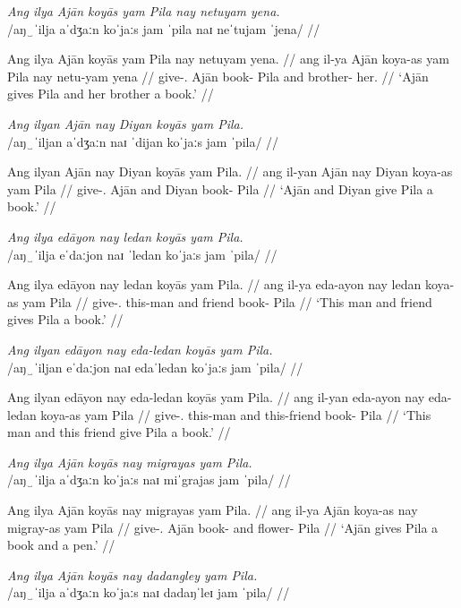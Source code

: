 \documentclass[12pt,a4paper]{scrartcl}
\newcommand{\TsgM}{{\Tsg}.{\M}}
\newcommand{\TplM}{{\Tpl}.{\M}}
\begin{document}
\ex\begingl
\glpreamble \textit{Ang ilya Ajān koyās yam Pila nay netuyam yena.}\\
	/aŋ‿ˈilja aˈdʒaːn koˈjaːs jam ˈpila naɪ neˈtujam ˈjena/ //

\gla Ang ilya Ajān koyās yam Pila nay netuyam yena. //
\glb ang il-ya Ajān koya-as yam Pila nay netu-yam yena //
\glc \AgtT{} give-\TsgM{} Ajān book-\Parg{} \Dat{} Pila and brother-\Dat{} her.\Gen{} //
\glft `Ajān gives Pila and her brother a book.' //
\endgl\xe

\ex\begingl
\glpreamble \textit{Ang ilyan Ajān nay Diyan koyās yam Pila.}\\
	/aŋ‿ˈiljan aˈdʒaːn naɪ ˈdijan koˈjaːs jam ˈpila/ //

\gla Ang ilyan Ajān nay Diyan koyās yam Pila. //
\glb ang il-yan Ajān nay Diyan koya-as yam Pila //
\glc \AgtT{} give-\TplM{} Ajān and Diyan book-\Parg{} \Dat{} Pila //
\glft `Ajān and Diyan give Pila a book.' //
\endgl\xe

\ex\begingl
\glpreamble \textit{Ang ilya edāyon nay ledan koyās yam Pila.}\\
	/aŋ‿ˈilja eˈdaːjon naɪ ˈledan koˈjaːs jam ˈpila/ //

\gla Ang ilya edāyon nay ledan koyās yam Pila. //
\glb ang il-ya eda-ayon nay ledan koya-as yam Pila //
\glc \AgtT{} give-\TsgM{} this-man and friend book-\Parg{} \Dat{} Pila //
\glft `This man and friend gives Pila a book.' //
\endgl\xe

\ex\begingl
\glpreamble \textit{Ang ilyan edāyon nay eda-ledan koyās yam Pila.}\\
	/aŋ‿ˈiljan eˈdaːjon naɪ edaˈledan koˈjaːs jam ˈpila/ //

\gla Ang ilyan edāyon nay eda-ledan koyās yam Pila. //
\glb ang il-yan eda-ayon nay eda-ledan koya-as yam Pila //
\glc \AgtT{} give-\TplM{} this-man and this-friend book-\Parg{} \Dat{} Pila //
\glft `This man and this friend give Pila a book.' //
\endgl\xe

\ex\begingl
\glpreamble \textit{Ang ilya Ajān koyās nay migrayas yam Pila.}\\
	/aŋ‿ˈilja aˈdʒaːn koˈjaːs naɪ miˈgrajas jam ˈpila/ //

\gla Ang ilya Ajān koyās nay migrayas yam Pila. //
\glb ang il-ya Ajān koya-as nay migray-as yam Pila //
\glc \AgtT{} give-\TsgM{} Ajān book-\Parg{} and flower-\Parg{} \Dat{} Pila //
\glft `Ajān gives Pila a book and a pen.' //
\endgl\xe

\ex\begingl
\glpreamble \textit{Ang ilya Ajān koyās nay dadangley yam Pila.}\\
	/aŋ‿ˈilja aˈdʒaːn koˈjaːs naɪ dadaŋˈleɪ jam ˈpila/ //
\end{document}
